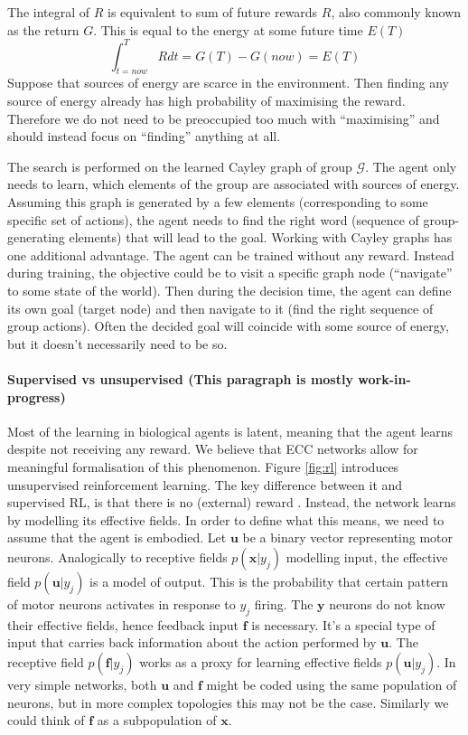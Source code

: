 \documentclass[12pt]{article}
\begin{document}
The integral of $R$ is equivalent to sum of future rewards $R$, also commonly known as the return $G$. This is equal to the energy at some future time $E(T)$
\[
\int_{t=now}^{T} R dt = G(T) - G(now) = E(T)
\]
Suppose that sources of energy are scarce in the environment. Then finding any source of energy already has high probability of maximising the reward. Therefore we do not need to be preoccupied too much with ``maximising'' and should instead focus on ``finding'' anything at all. 

The search is performed on the learned Cayley graph of group $\mathcal{G}$. The agent only needs to learn, which elements of the group are associated with sources of energy. Assuming this graph is generated by a few elements (corresponding to some specific set of actions), the agent needs to find the right word (sequence of group-generating elements) that will lead to the goal. Working with Cayley graphs has one additional advantage. The agent can be trained without any reward. Instead during training, the objective could be to visit a specific graph node (``navigate'' to some state of the world).  Then during the decision time, the agent can define its own goal (target node) and then navigate to it (find the right sequence of group actions). Often the decided goal will coincide with some source of energy, but it doesn't necessarily need to be so.

\paragraph{Supervised vs unsupervised (This paragraph is mostly work-in-progress)}
Most of the learning in biological agents is latent, meaning that the agent learns despite not receiving any reward. We believe that ECC networks allow for meaningful formalisation of this phenomenon. Figure \ref{fig:rl} introduces unsupervised reinforcement learning. The key difference between it and supervised RL, is that there is no (external) reward . Instead, the network learns by modelling its effective fields. In order to define what this means, we need to assume that the agent is embodied. Let $\boldsymbol{u}$ be a binary vector representing motor neurons.
Analogically to receptive fields $p(\boldsymbol{x}|y_j)$ modelling input, the effective field
$p(\boldsymbol{u}|y_j)$ is a model of output. This is the probability that certain pattern of motor neurons activates in response to $y_j$ firing. The $\boldsymbol{y}$ neurons do not know their effective fields, hence feedback input $\boldsymbol{f}$ is necessary. It's a special type of input that carries back information about the action performed by $\boldsymbol{u}$. The receptive field $p(\boldsymbol{f}|y_j)$ works as a proxy for learning effective fields $p(\boldsymbol{u}|y_j)$. In very simple networks, both $\boldsymbol{u}$ and $\boldsymbol{f}$ might be coded using the same population of neurons, but in more complex topologies this may not be the case. Similarly we could think of $\boldsymbol{f}$ as a subpopulation of $\boldsymbol{x}$. 
\end{document}

